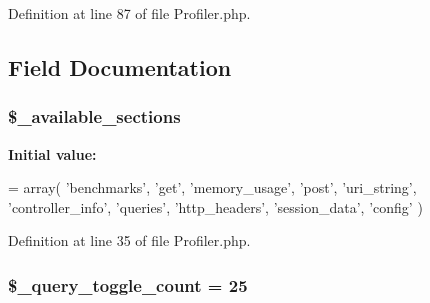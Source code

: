 Definition at line 87 of file Profiler.\-php.



\subsection{Field Documentation}
\subsubsection[{\$\-\_\-available\-\_\-sections}]{\setlength{\rightskip}{0pt plus 5cm}\$\-\_\-available\-\_\-sections\hspace{0.3cm}{\ttfamily [protected]}}\label{class_c_i___profiler_ae30756727f63d3be7422d378676f667d}
{\bfseries Initial value\-:}
\begin{DoxyCode}
= array(
                                        \textcolor{stringliteral}{'benchmarks'},
                                        \textcolor{stringliteral}{'get'},
                                        \textcolor{stringliteral}{'memory\_usage'},
                                        \textcolor{stringliteral}{'post'},
                                        \textcolor{stringliteral}{'uri\_string'},
                                        \textcolor{stringliteral}{'controller\_info'},
                                        \textcolor{stringliteral}{'queries'},
                                        \textcolor{stringliteral}{'http\_headers'},
                                        \textcolor{stringliteral}{'session\_data'},
                                        \textcolor{stringliteral}{'config'}
                                        )
\end{DoxyCode}


Definition at line 35 of file Profiler.\-php.

\subsubsection[{\$\-\_\-query\-\_\-toggle\-\_\-count}]{\setlength{\rightskip}{0pt plus 5cm}\$\-\_\-query\-\_\-toggle\-\_\-count = 25\hspace{0.3cm}{\ttfamily [protected]}}\label{class_c_i___profiler_a950aa6662ddde22ba9c05adffd6a20c9}


